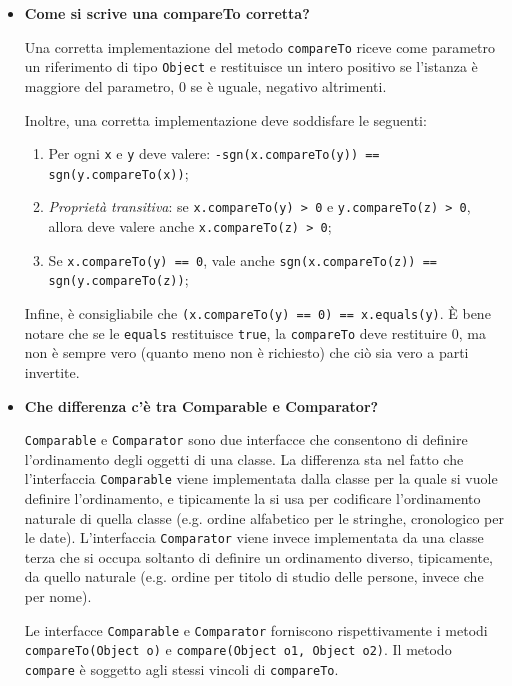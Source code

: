 \documentclass[12pt, a4paper]{article}
\begin{document}
\begin{itemize}
    \item \textbf{Come si scrive una compareTo corretta?}
    
    Una corretta implementazione del metodo \texttt{compareTo} riceve come parametro
    un riferimento di tipo \texttt{Object} e restituisce un intero positivo se
    l'istanza è maggiore del parametro, 0 se è uguale, negativo altrimenti.

    Inoltre, una corretta implementazione deve soddisfare le seguenti:
    \begin{enumerate}[label=(\roman*)]
        \item Per ogni \texttt{x} e \texttt{y} deve valere:
        \texttt{-sgn(x.compareTo(y)) == sgn(y.compareTo(x))};
        \item \emph{Proprietà transitiva}: se \texttt{x.compareTo(y) > 0} e
        \texttt{y.compareTo(z) > 0}, allora deve valere anche
        \texttt{x.compareTo(z) > 0};
        \item Se \texttt{x.compareTo(y) == 0}, vale anche
        \texttt{sgn(x.compareTo(z)) == sgn(y.compareTo(z))};
    \end{enumerate}
    Infine, è consigliabile che \texttt{(x.compareTo(y) == 0) == x.equals(y)}. È
    bene notare che se le \texttt{equals} restituisce \texttt{true}, la \texttt
    {compareTo} deve restituire 0, ma non è sempre vero (quanto meno non è richiesto)
    che ciò sia vero a parti invertite.
    
    \item \textbf{Che differenza c'è tra Comparable e Comparator?}
    
    \texttt{Comparable} e \texttt{Comparator} sono due interfacce che consentono
    di definire l'ordinamento degli oggetti di una classe. La differenza sta nel
    fatto che l'interfaccia \texttt{Comparable} viene implementata dalla classe
    per la quale si vuole definire l'ordinamento, e tipicamente la si usa per
    codificare l'ordinamento naturale di quella classe (e.g. ordine alfabetico per
    le stringhe, cronologico per le date). L'interfaccia \texttt{Comparator} viene
    invece implementata da una classe terza che si occupa soltanto di definire un
    ordinamento diverso, tipicamente, da quello naturale (e.g. ordine per titolo
    di studio delle persone, invece che per nome).

    Le interfacce \texttt{Comparable} e \texttt{Comparator} forniscono rispettivamente
    i metodi \texttt{compareTo(Object o)} e \texttt{compare(Object o1, Object o2)}.
    Il metodo \texttt{compare} è soggetto agli stessi vincoli di \texttt{compareTo}.
\end{itemize}
\end{document}
